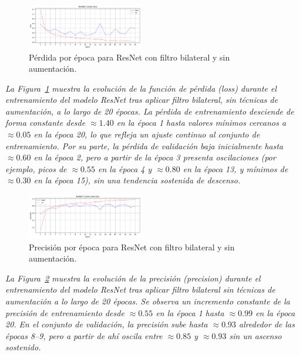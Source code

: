 \documentclass[conference]{IEEEtran}
\begin{document}
\begin{figure}[H]
    \centering
    \includegraphics[width=0.45\textwidth]{graphics-resnet-bilateral/resnet_bilateral_without_loss.png}
    \caption{Pérdida por época para ResNet con filtro bilateral y sin aumentación.}
    \label{fig:resnet_bilateral_without_loss}
\end{figure}
\noindent\textit{%
La Figura~\ref{fig:resnet_bilateral_without_loss} muestra la evolución de la función de pérdida (loss) durante el entrenamiento del modelo ResNet tras aplicar filtro bilateral, sin técnicas de aumentación, a lo largo de 20 épocas. La pérdida de entrenamiento desciende de forma constante desde \(\approx1.40\) en la época 1 hasta valores mínimos cercanos a \(\approx0.05\) en la época 20, lo que refleja un ajuste continuo al conjunto de entrenamiento. Por su parte, la pérdida de validación baja inicialmente hasta \(\approx0.60\) en la época 2, pero a partir de la época 3 presenta oscilaciones (por ejemplo, picos de \(\approx0.55\) en la época 4 y \(\approx0.80\) en la época 13, y mínimos de \(\approx0.30\) en la época 15), sin una tendencia sostenida de descenso.
}

\begin{figure}[H]
    \centering
    \includegraphics[width=0.45\textwidth]{graphics-resnet-bilateral/resnet_bilateral_without_precision.png}
    \caption{Precisión por época para ResNet con filtro bilateral y sin aumentación.}
    \label{fig:resnet_bilateral_without_precision}
\end{figure}
\noindent\textit{%
La Figura~\ref{fig:resnet_bilateral_without_precision} muestra la evolución de la precisión (precision) durante el entrenamiento del modelo ResNet tras aplicar filtro bilateral sin técnicas de aumentación a lo largo de 20 épocas. Se observa un incremento constante de la precisión de entrenamiento desde \(\approx0.55\) en la época 1 hasta \(\approx0.99\) en la época 20. En el conjunto de validación, la precisión sube hasta \(\approx0.93\) alrededor de las épocas 8–9, pero a partir de ahí oscila entre \(\approx0.85\) y \(\approx0.93\) sin un ascenso sostenido.
}
\end{document}
